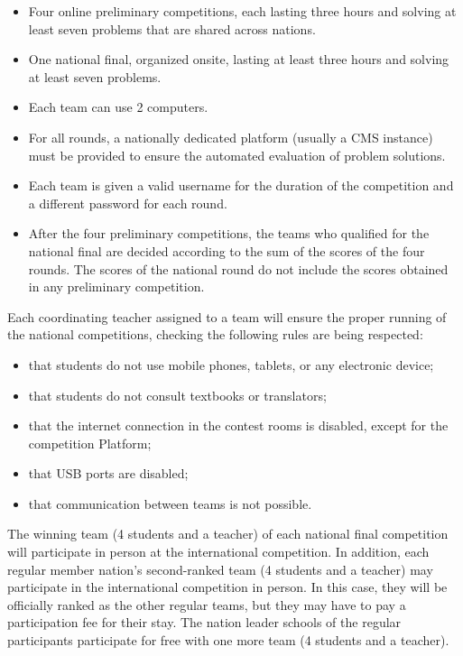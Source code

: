 \documentclass{article}
\begin{document}
\begin{itemize}
    \item Four online preliminary competitions, each lasting three hours and solving at least seven problems that are shared across nations.
    \item One national final, organized onsite, lasting at least three hours and solving at least seven problems.
    \item Each team can use 2 computers.
    \item For all rounds, a nationally dedicated platform (usually a CMS instance) must be provided to ensure the automated evaluation of problem solutions.
    \item Each team is given a valid username for the duration of the competition and a different password for each round.
    \item After the four preliminary competitions, the teams who qualified for the national final are decided according to the sum of the scores of the four rounds. The scores of the national round do not include the scores obtained in any preliminary competition.
\end{itemize}

Each coordinating teacher assigned to a team will ensure the proper running of the national competitions, checking the following rules are being respected:

\begin{itemize}
\item that students do not use mobile phones, tablets, or any electronic device; 
\item that students do not consult textbooks or translators; 
\item that the internet connection in the contest rooms is disabled, except for the competition Platform; 
\item that USB ports are disabled; 
\item that communication between teams is not possible. 
\end{itemize}

The winning team (4 students and a teacher) of each national final competition will participate in person at the international competition. In addition, each regular member nation's second-ranked team (4 students and a teacher) may participate in the international competition in person. In this case, they will be officially ranked as the other regular teams, but they may have to pay a participation fee for their stay. The nation leader schools of the regular participants participate for free with one more team (4 students and a teacher).
\end{document}
